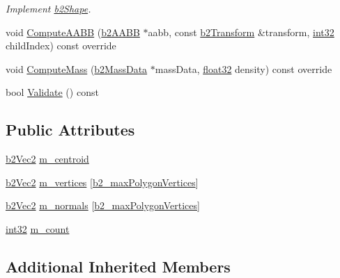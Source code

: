 \begin{DoxyCompactItemize}
\begin{DoxyCompactList}\small\item\em Implement \mbox{\hyperlink{classb2_shape}{b2\+Shape}}. \end{DoxyCompactList}\item 
void \mbox{\hyperlink{classb2_polygon_shape_ae9bcc185caf4a030003cefc4576e4717}{Compute\+A\+A\+BB}} (\mbox{\hyperlink{structb2_a_a_b_b}{b2\+A\+A\+BB}} $\ast$aabb, const \mbox{\hyperlink{structb2_transform}{b2\+Transform}} \&transform, \mbox{\hyperlink{b2_settings_8h_a43d43196463bde49cb067f5c20ab8481}{int32}} child\+Index) const override
\item 
void \mbox{\hyperlink{classb2_polygon_shape_a908db2a51fc79fd49d6fe06be2cd8474}{Compute\+Mass}} (\mbox{\hyperlink{structb2_mass_data}{b2\+Mass\+Data}} $\ast$mass\+Data, \mbox{\hyperlink{b2_settings_8h_aacdc525d6f7bddb3ae95d5c311bd06a1}{float32}} density) const override
\item 
bool \mbox{\hyperlink{classb2_polygon_shape_a135f4c20e17f10479e08f7befbd4d1f0}{Validate}} () const
\end{DoxyCompactItemize}
\subsection*{Public Attributes}
\begin{DoxyCompactItemize}
\item 
\mbox{\hyperlink{structb2_vec2}{b2\+Vec2}} \mbox{\hyperlink{classb2_polygon_shape_ae8f5bd2f13f1e9b741c33350ba19cd9f}{m\+\_\+centroid}}
\item 
\mbox{\hyperlink{structb2_vec2}{b2\+Vec2}} \mbox{\hyperlink{classb2_polygon_shape_a11ee5c107660be5da25f0e164aaccd53}{m\+\_\+vertices}} \mbox{[}\mbox{\hyperlink{b2_settings_8h_a09d71ee1993bee28b5b2e6d893b41884}{b2\+\_\+max\+Polygon\+Vertices}}\mbox{]}
\item 
\mbox{\hyperlink{structb2_vec2}{b2\+Vec2}} \mbox{\hyperlink{classb2_polygon_shape_a97cdcec277321c62ecdf93cb649958ce}{m\+\_\+normals}} \mbox{[}\mbox{\hyperlink{b2_settings_8h_a09d71ee1993bee28b5b2e6d893b41884}{b2\+\_\+max\+Polygon\+Vertices}}\mbox{]}
\item 
\mbox{\hyperlink{b2_settings_8h_a43d43196463bde49cb067f5c20ab8481}{int32}} \mbox{\hyperlink{classb2_polygon_shape_a2c8cfdc15267f282e66f7bda7369b79f}{m\+\_\+count}}
\end{DoxyCompactItemize}
\subsection*{Additional Inherited Members}


